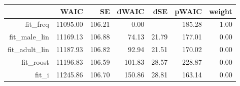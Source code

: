 \begin{table}[ht]
\centering
\begin{tabular}{rrrrrrr}
  \hline
 & WAIC & SE & dWAIC & dSE & pWAIC & weight \\ 
  \hline
fit\_freq & 11095.00 & 106.21 & 0.00 &  & 185.28 & 1.00 \\ 
  fit\_male\_lin & 11169.13 & 106.88 & 74.13 & 21.79 & 177.01 & 0.00 \\ 
  fit\_adult\_lin & 11187.93 & 106.82 & 92.94 & 21.51 & 170.02 & 0.00 \\ 
  fit\_roost & 11196.83 & 106.59 & 101.83 & 28.57 & 228.87 & 0.00 \\ 
  fit\_i & 11245.86 & 106.70 & 150.86 & 28.81 & 163.14 & 0.00 \\ 
   \hline
\end{tabular}
\end{table}

